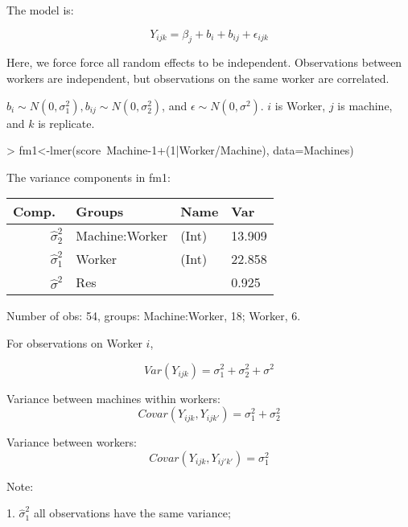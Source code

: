 \documentclass[10pt,landscape]{article}
\begin{document}
\begin{multicols}{3}
The model is:

\begin{equation}
Y_{ijk} = \beta_j + b_i + b_{ij} + \epsilon_{ijk}
\end{equation}

Here, we force force all random effects to be independent.
Observations between workers are independent, but observations on the same worker are correlated.

$b_i \sim N(0,\sigma_1^2), b_{ij} \sim N(0,\sigma_2^2)$, and $\epsilon\sim N(0,\sigma^2)$. $i$ is Worker, $j$ is machine, and $k$ is replicate.  

\begin{Schunk}
\begin{Sinput}
> fm1<-lmer(score~Machine-1+(1|Worker/Machine),
   data=Machines)
\end{Sinput}
\end{Schunk}

The variance components in fm1:

\small
\begin{tabular}{rlll}
  \hline
Comp.\ & Groups & Name & Var\\ 
  \hline
$\hat{\sigma}_2^2$ & Machine:Worker & (Int) & 13.909  \\ 
$\hat{\sigma}_1^2$  & Worker & (Int) & 22.858  \\ 
$\hat{\sigma}^2$& Res &  &  0.925 \\ 
   \hline
\end{tabular}

Number of obs: 54, groups: Machine:Worker, 18; Worker, 6.

\normalsize

For observations on Worker $i$, 

\begin{equation}
Var(Y_{ijk})= \sigma_1^2 + \sigma_2^2 + \sigma^2 
\end{equation}

Variance between machines within workers:
\begin{equation}
Covar(Y_{ijk},Y_{ijk'})= \sigma_1^2 + \sigma_2^2
\end{equation}

Variance between workers:
\begin{equation}
Covar(Y_{ijk},Y_{ij'k'})= \sigma_1^2
\end{equation}

Note:

1. $\hat{\sigma}_1^2$ all observations have the same variance;


\end{multicols}
\end{document}
